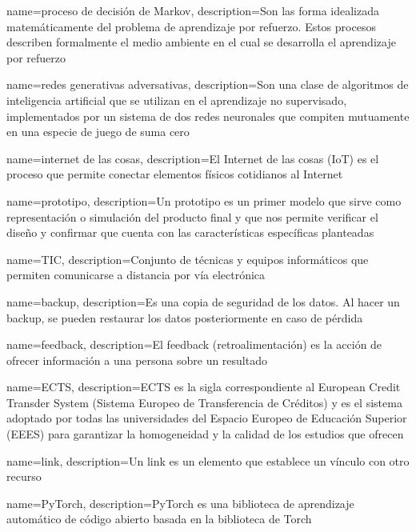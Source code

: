 {
    name=proceso de decisión de Markov,
    description={Son las forma idealizada matemáticamente del problema de aprendizaje por refuerzo. Estos procesos describen formalmente el medio ambiente en el cual se desarrolla el aprendizaje por refuerzo}
}

{
    name=redes generativas adversativas,
    description={Son una clase de algoritmos de inteligencia artificial que se utilizan en el aprendizaje no supervisado, implementados por un sistema de dos redes neuronales que compiten mutuamente en una especie de juego de suma cero}
}

{
    name=internet de las cosas,
    description={El Internet de las cosas (IoT) es el proceso que permite conectar elementos físicos cotidianos al Internet}
}

{
    name=prototipo,
    description={Un prototipo es un primer modelo que sirve como representación o simulación del producto final y que nos permite verificar el diseño y confirmar que cuenta con las características específicas planteadas}
}

{
    name=TIC,
    description={Conjunto de técnicas y equipos informáticos que permiten comunicarse a distancia por vía electrónica}
}

{
    name=backup,
    description={Es una copia de seguridad de los datos. Al hacer un backup, se pueden restaurar los datos posteriormente en caso de pérdida}
}

{
    name=feedback,
    description={El feedback (retroalimentación) es la acción de ofrecer información a una persona sobre un resultado}
}

{
    name=ECTS,
    description={ECTS es la sigla correspondiente al European Credit Transder System (Sistema Europeo de Transferencia de Créditos) y es el sistema adoptado por todas las universidades del Espacio Europeo de Educación Superior (EEES) para garantizar la homogeneidad y la calidad de los estudios que ofrecen}
}

{
    name=link,
    description={Un link es un elemento que establece un vínculo con otro recurso}
}

{
    name=PyTorch,
    description={PyTorch es una biblioteca de aprendizaje automático​ de código abierto basada en la biblioteca de Torch}
}

